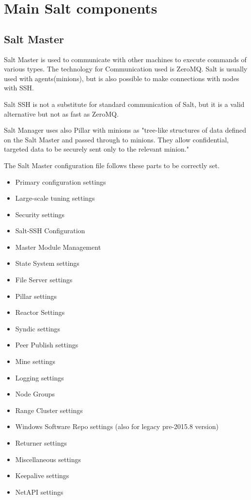 \documentclass[12pt,a4paper,openright,twoside]{book}
\begin{document}
\section{Main Salt components}

\subsection{Salt Master}

Salt Master is used to communicate with other machines to execute commands of various types.
The technology for Communication used is ZeroMQ. Salt is usually used with agents(minions), but is also possible to make connections with nodes with SSH.

Salt SSH is not a substitute for standard communication of Salt, but it is a valid alternative but not as fast as ZeroMQ\cite{saltSSH}.

Salt Manager uses also Pillar with minions as
"tree-like structures of data defined on the Salt Master and passed through to minions.
They allow confidential, targeted data to be securely sent only to the relevant minion."\cite{saltDocPillar}

The Salt Master configuration file follows these parts to be correctly set.
\begin{itemize}
    \item Primary configuration settings
    \item Large-scale tuning settings
    \item Security settings
    \item Salt-SSH Configuration
    \item Master Module Management
    \item State System settings
    \item File Server settings
    \item Pillar settings
    \item Reactor Settings
    \item Syndic settings
    \item Peer Publish settings
    \item Mine settings
    \item Logging settings
    \item Node Groups
    \item Range Cluster settings
    \item Windows Software Repo settings (also for legacy pre-2015.8 version)
    \item Returner settings
    \item Miscellaneous settings
    \item Keepalive settings
    \item NetAPI settings
    \end{itemize}
\end{document}
